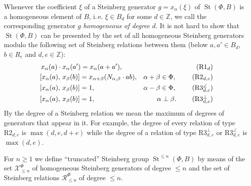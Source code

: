 \documentclass[oneside, 8pt]{amsart}
\theoremstyle{remark}
\theoremstyle{definition}
\numberwithin{lemma}{section}
\numberwithin{prop}{section}
\numberwithin{corollary}{section}
\numberwithin{externaltheorem}{section}
\DeclareMathOperator{\St}{St}
\numberwithin{equation}{section}
\begin{document}
Whenever the coefficient $\xi$ of a Steinberg generator $g = x_\alpha(\xi)$ of $\St(\Phi, B)$ is a homogeneous element of $B$, i.\,e. $\xi \in B_d$ for some $d \in \mathbb{Z}$,
 we call the corresponding generator $g$ {\it homogeneous of degree $d$}.
It is not hard to show that $\St(\Phi, B)$ can be presented by the set of all homogeneous Steinberg generators modulo the following set of Steinberg relations
 between them (below $a, a' \in B_d$, $b\in R_e$ and $d,e \in \mathbb{Z}$): 
\begin{align}
&\,\,x_{\alpha}(a)\cdot x_{\alpha}(a') =  x_{\alpha}(a+a'),                        & \tag{R$1_d$} \\
&\,[x_{\alpha}(a),\,x_{\beta}(b)]= x_{\alpha+\beta}(N_{\alpha, \beta} \cdot ab),   & \alpha + \beta \in \Phi,\ \tag{R$2_{d,e}$} \\
&\,[x_{\alpha}(a),\,x_{\beta}(b)]= 1,                                              & \alpha - \beta \in \Phi,\ \tag{R$3^\angle_{d,e}$} \\
&\,[x_{\alpha}(a),\,x_{\beta}(b)]= 1,                                              & \alpha \perp \beta.\ \tag{R$3^\bot_{d,e}$}
\end{align}
By the degree of a Steinberg relation we mean the maximum of degrees of generators that appear in it.
For example, the degree of every relation of type $\text{R2}_{d,e}$ is $\max(d,e,d+e)$ 
 while the degree of a relation of type $\text{R3}^\bot_{d,e}$ or $\text{R3}^\angle_{d,e}$ is $\max(d,e)$.

For $n\geq 1$ we define ``truncated'' Steinberg group $\St^{\leq n}(\Phi, B)$ by means of the set $\mathcal{X}_{\leq n}^\Phi$ of homogeneous Steinberg generators of degree $\leq n$ and the set of Steinberg relations $\mathcal{R}_{\leq n}^\Phi$ of degree $\leq n$.
\end{document}
